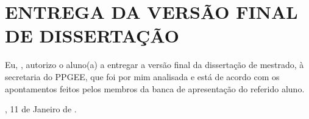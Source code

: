 \printindex

\clearpage\thispagestyle{empty}\addtocounter{page}{-1}
\section*{ENTREGA DA VERSÃO FINAL DE DISSERTAÇÃO}

\vspace*{2cm}
Eu, \textsc{\imprimirorientador}, autorizo o aluno(a) \textsc{\imprimirautor} a entregar a versão final da dissertação de mestrado, à secretaria do PPGEE, que foi por mim analisada e está de acordo com os apontamentos feitos pelos membros da banca de apresentação do referido aluno.

\vspace*{1cm}
\begin{center}   
\end{center}

\vspace*{1cm}
\begin{flushright}
	\imprimirlocal, 11 de Janeiro de \imprimirdata.
\end{flushright}
\clearpage
